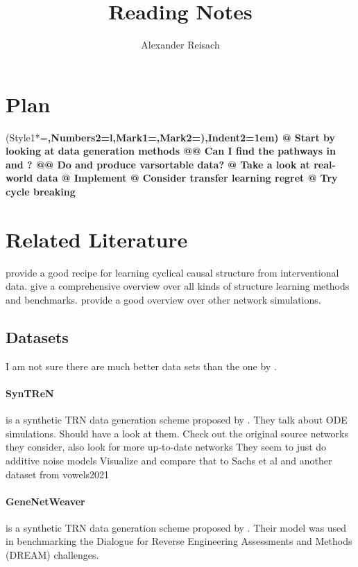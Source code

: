 \documentclass{article}
\title{Reading Notes}
\author{Alexander Reisach}
\begin{document}
    
\maketitle

\section{Plan}
\begin{easylist}
    \ListProperties(Style1*=\bfseries,Numbers2=l,Mark1={},Mark2={)},Indent2=1em)
    @ Start by looking at data generation methods
    @@ Can I find the \cite{sachs2005causal} pathways in \cite{belinky2015pathcards} and \cite{perfetto2016signor}?
    @@ Do \cite{van2006syntren} and \cite{schaffter2011genenetweaver} produce varsortable data?
    @ Take a look at real-world data
    @ Implement \cite{brouillard2020differentiable}
    @ Consider transfer learning regret
    @ Try cycle breaking
\end{easylist}

\section{Related Literature}
\cite{itani2010structure} provide a good recipe for learning cyclical causal structure from interventional data.
\cite{vowels2021} give a comprehensive overview over all kinds of structure learning methods and benchmarks.
\cite{van2006syntren} provide a good overview over other network simulations.

\subsection{Datasets}

I am not sure there are much better data sets than the one by \cite{sachs2005causal}.

\paragraph{SynTReN}
is a synthetic TRN data generation scheme proposed by \cite{van2006syntren}. 
They talk about ODE simulations. Should have a look at them.
Check out the original source networks they consider, also look for more up-to-date networks
They seem to just do additive noise models
Visualize and compare that to Sachs et al and another dataset from vowels2021

\paragraph{GeneNetWeaver} is a synthetic TRN data generation scheme proposed by \cite{schaffter2011genenetweaver}. Their model was used in benchmarking the Dialogue for Reverse Engineering Assessments and Methods (DREAM) challenges.
\end{document}
